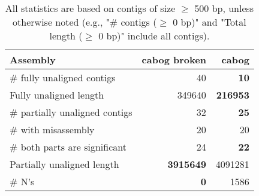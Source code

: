\documentclass[12pt,a4paper]{article}
\begin{document}
\begin{table}[ht]
\begin{center}
\caption{All statistics are based on contigs of size $\geq$ 500 bp, unless otherwise noted (e.g., "\# contigs ($\geq$ 0 bp)" and "Total length ($\geq$ 0 bp)" include all contigs).}
\begin{tabular}{|l*{2}{|r}|}
\hline
Assembly & cabog broken & cabog \\ \hline
\# fully unaligned contigs & 40 & {\bf 10} \\ \hline
Fully unaligned length & 349640 & {\bf 216953} \\ \hline
\# partially unaligned contigs & 32 & {\bf 25} \\ \hline
\hspace{5mm}\# with misassembly & 20 & 20 \\ \hline
\hspace{5mm}\# both parts are significant & 24 & {\bf 22} \\ \hline
Partially unaligned length & {\bf 3915649} & 4091281 \\ \hline
\# N's & {\bf 0} & 1586 \\ \hline
\end{tabular}
\end{center}
\end{table}
\end{document}
